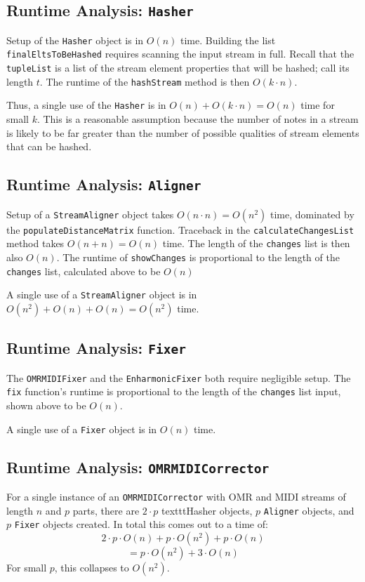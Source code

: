\subsection{Runtime Analysis: \texttt{Hasher}}
Setup of the \texttt{Hasher} object is in $O(n)$ time. Building the list \texttt{finalEltsToBeHashed} requires scanning the input stream in full. Recall that the \texttt{tupleList} is a list of the stream element properties that will be hashed; call its length $t$. The runtime of the \texttt{hashStream} method is then $O(k \cdot n)$. 

Thus, a single use of the \texttt{Hasher} is in $O(n) + O(k \cdot n) = O(n)$ time for small $k$. This is a reasonable assumption because the number of notes in a stream is likely to be far greater than the number of possible qualities of stream elements that can be hashed. 

\subsection{Runtime Analysis: \texttt{Aligner}}
Setup of a \texttt{StreamAligner} object takes $O(n \cdot n) = O(n^2)$ time, dominated by the \texttt{populateDistanceMatrix} function. Traceback in the \texttt{calculateChangesList} method takes $O(n+ n) = O(n)$ time. The length of the \texttt{changes} list is then also $O(n)$. The runtime of \texttt{showChanges} is proportional to the length of the \texttt{changes} list, calculated above to be $O(n)$

A single use of a \texttt{StreamAligner} object is in $O(n^2) + O(n) +O(n) = O(n^2)$ time. 

\subsection{Runtime Analysis: \texttt{Fixer}}
The \texttt{OMRMIDIFixer} and the \texttt{EnharmonicFixer} both require negligible setup. The \texttt{fix} function's runtime is proportional to the length of the \texttt{changes} list input, shown above to be $O(n)$. 

A single use of a \texttt{Fixer} object is in $O(n)$ time. 

\subsection{Runtime Analysis: \texttt{OMRMIDICorrector}}
For a single instance of an \texttt{OMRMIDICorrector} with OMR and MIDI streams of length $n$ and $p$ parts, there are $2 \cdot p$ texttt{Hasher} objects, $p$ \texttt{Aligner} objects, and $p$ \texttt{Fixer} objects created. In total this comes out to a time of:
$$2 \cdot p \cdot O(n) + p \cdot O(n^2) + p \cdot O(n)$$
$$ = p \cdot O(n^2) + 3 \cdot O(n)$$ For small $p$, this collapses to $O(n^2)$. 
 
